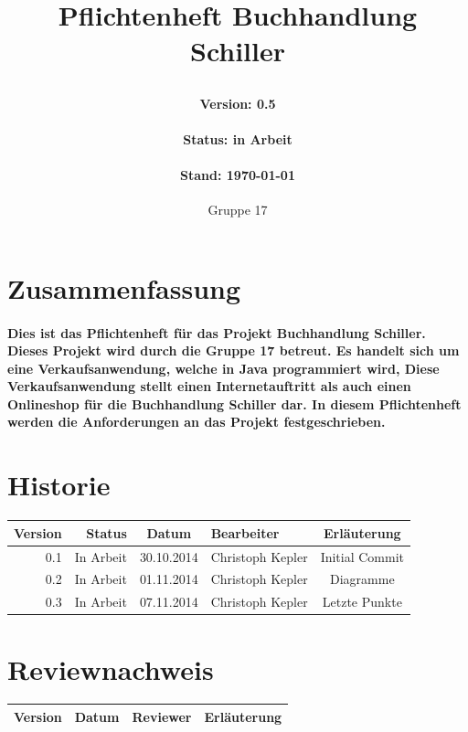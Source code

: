 \documentclass[a4paper]{article}
\author{Gruppe 17}
\title{
	\normalfont
	\normalsize 
	\huge{Pflichtenheft Buchhandlung Schiller}
	\horrule{0.5pt}
	\paragraph{Version: 0.5}
	\paragraph{Status: in Arbeit}
	\paragraph{Stand: \today}
	\horrule{2pt}
}
\begin{document}
\maketitle

\newpage
 
\section*{Zusammenfassung}

\paragraph{Dies ist das Pflichtenheft für das Projekt Buchhandlung Schiller. Dieses Projekt wird durch die Gruppe 17 betreut. Es handelt sich um eine Verkaufsanwendung, welche in Java programmiert wird, Diese Verkaufsanwendung stellt einen Internetauftritt als auch einen Onlineshop für die Buchhandlung Schiller dar. In diesem Pflichtenheft werden die Anforderungen an das Projekt festgeschrieben.}
 
\section*{Historie}

\begin{tabular}{|r|r|c|l|c|}
	\hline
	\rowcolor[HTML]{C0C0C0} 
	Version & Status    & Datum      & Bearbeiter       & Erläuterung    \\ \hline
	0.1     & In Arbeit & 30.10.2014 & Christoph Kepler & Initial Commit \\ \hline
	0.2     & In Arbeit & 01.11.2014 & Christoph Kepler & Diagramme      \\ \hline
	0.3     & In Arbeit & 07.11.2014 & Christoph Kepler & Letzte Punkte  \\ \hline
\end{tabular}

\section*{Reviewnachweis}

\begin{tabular}{|l|l|l|l|}
	\hline
	\rowcolor[HTML]{C0C0C0} 
	Version & Datum      & Reviewer       & Erläuterung    \\ \hline
\end{tabular}
\end{document}
